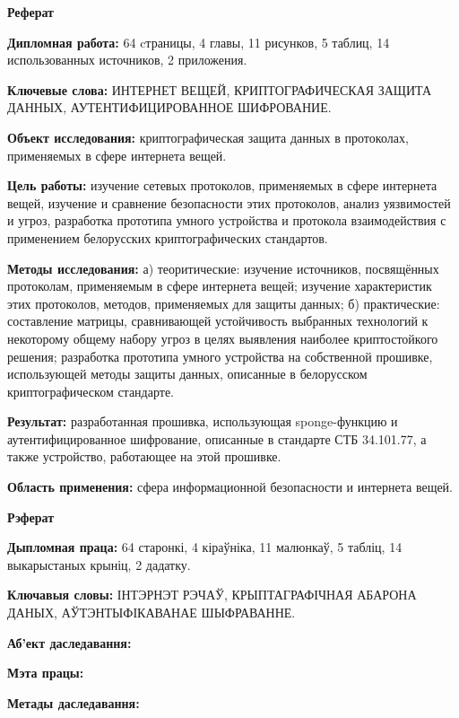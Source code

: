 \newpage
\begin{center}{\bf \Large Реферат}\end{center}
  
\textbf{Дипломная работа:} 64 cтраницы, 4 главы, 11 рисунков, 5 таблиц, 14 использованных источников,
2 приложения.

\textbf{Ключевые слова:} ИНТЕРНЕТ ВЕЩЕЙ, КРИПТОГРАФИЧЕСКАЯ ЗАЩИТА ДАННЫХ, 
АУТЕНТИФИЦИРОВАННОЕ ШИФРОВАНИЕ.

\textbf{Объект исследования:} криптографическая защита данных в протоколах, применяемых в сфере 
интернета вещей.

\textbf{Цель работы:} изучение сетевых протоколов, применяемых в сфере интернета вещей, изучение
и сравнение безопасности этих протоколов, анализ уязвимостей и угроз, разработка прототипа умного
устройства и протокола взаимодействия с применением белорусских криптографических стандартов.

\textbf{Методы исследования:} а) теоритические: изучение источников, посвящённых протоколам,
применяемым в сфере интернета вещей; изучение характеристик этих протоколов, методов, применяемых
для защиты данных; б) практические: составление матрицы, сравнивающей устойчивость выбранных 
технологий к некоторому общему набору угроз в целях выявления наиболее криптостойкого решения;
разработка прототипа умного устройства на собственной прошивке, использующей методы защиты
данных, описанные в белорусском криптографическом стандарте.

\textbf{Результат:} разработанная прошивка, использующая sponge-функцию и аутентифицированное
шифрование, описанные в стандарте СТБ 34.101.77, а также устройство, работающее на этой прошивке.

\textbf{Область применения:} сфера информационной безопасности и интернета вещей.



\newpage
\begin{center}{\bf \Large Рэферат}\end{center}

\textbf{Дыпломная праца:} 64 старонкі, 4 кіраўніка, 11 малюнкаў, 5 табліц, 14 выкарыстаных крыніц,
2 дадатку.

\textbf{Ключавыя словы:} ІНТЭРНЭТ РЭЧАЎ, КРЫПТАГРАФІЧНАЯ АБАРОНА ДАНЫХ, АЎТЭНТЫФІКАВАНАЕ 
ШЫФРАВАННЕ.

\textbf{Аб'ект даследавання:} 

\textbf{Мэта працы:} 

\textbf{Метады даследавання:}

